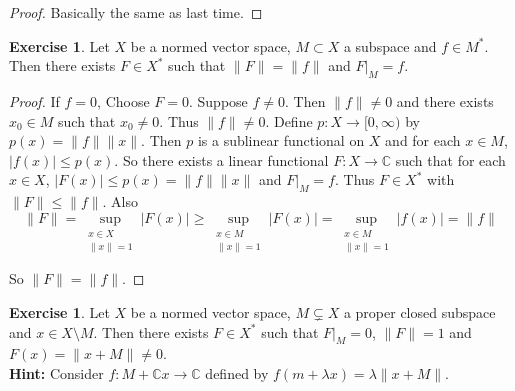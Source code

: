 \documentclass[12pt]{amsart}
\theoremstyle{definition}
\newtheorem{ex}[definition]{Exercise}
\newcommand{\lam}{\lambda}
\newcommand{\C}{\mathbb{C}}
\newcommand{\tbf}[1]{\textbf{#1}}
\newcommand{\Rg}{[0,\infty)}
\DeclareMathOperator*{\0}{\mbf{0}}
\DeclareMathOperator*{\1}{\mbf{1}}
\newcommand{\lex}[1]{\label{ex:#1}}
\begin{document}
	\begin{proof}
	Basically the same as last time.
	\end{proof}
	
	\begin{ex} \lex{55016}
		Let $X$ be a normed vector space, $M \subset X$ a subspace and $f \in M^*$. Then there exists $F \in X^*$ such that $\|F \|= \|f \|$ and $F|_M = f$.  
	\end{ex}
	
	\begin{proof}
		If $f =0$, Choose $F=0$. Suppose $f \neq 0$. Then $\|f \|\neq 0$ and there exists $x_0 \in M$ such that $x_0  \neq 0$. Thus $\|f \| \neq 0$. Define $p:X \rightarrow \Rg$ by $ p(x) = \|f \|\|x \|$. Then $p$ is a sublinear functional on $X$ and for each $x \in M$, $\vert f(x) \vert \leq p(x)$. So there exists a linear functional $F:X \rightarrow \C$ such that for each $x \in X$, $\vert F(x) \vert \leq p(x) = \|f \|\|x \|$ and $F|_M = f$. Thus $F \in X^*$ with $\|F \|\leq \|f \|$. Also $$\|F \|= \sup_{\substack{ x \in X \\ \|x \|= 1}} \vert F(x) \vert \geq  \sup_{\substack{ x \in M \\ \|x \|= 1}} \vert F(x) \vert = \sup_{\substack{ x \in M \\ \|x \|= 1}} \vert f(x) \vert = \|f \|$$
		
		So $\|F \|= \|f \|$.
	\end{proof}
	
	\begin{ex} \lex{55017}
		Let $X$ be a normed vector space, $M \subsetneq X$ a proper closed subspace and $x \in X \setminus M$. Then there exists $F \in X^*$ such that $F|_M = 0$, $\|F \|=1$ and $ F(x) = \|x+M \|\neq 0$. \\
		\tbf{Hint:} Consider $f:M+\C x \rightarrow \C$ defined by $f(m+\lam x) = \lam \|x +M \|$.
	\end{ex}
	
\end{document}
